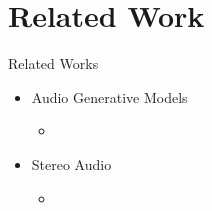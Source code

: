 \section{Related Work}
\begin{frame}{Related Works}
    \begin{itemize}
        \item Audio Generative Models
            \begin{itemize}
                \item 
            \end{itemize}
        \item Stereo Audio
            \begin{itemize}
                \item 
            \end{itemize}
    \end{itemize}
\end{frame}